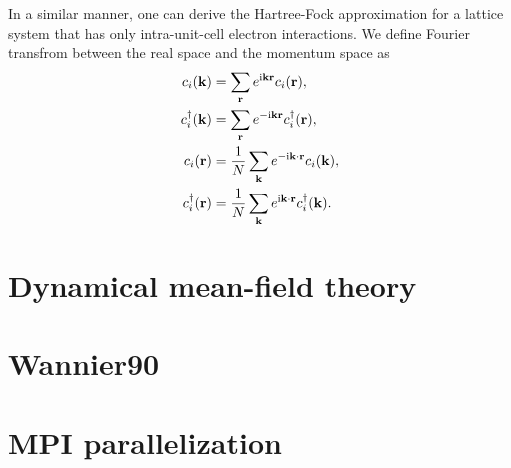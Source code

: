\documentclass[submission, LectureNotes]{SciPost}
\newcommand{\bk}{\ensuremath{{\bf k}}}
\newcommand{\br}{\ensuremath{{\bf r}}}
\newcommand\ii{\mathrm{i}}%
\begin{document}
In a similar manner, one can derive the Hartree-Fock approximation for a lattice system that
has only intra-unit-cell electron interactions.
We define Fourier transfrom between the real space and the momentum space as
\begin{align}
    c_i(\bk) &=  \sum_{\bf r} e^{\ii {\bf k} {\bf r}} c_i({\bf r}),\\
    c^\dagger_i(\bk) &=  \sum_{\bf r} e^{-\ii {\bf k} {\bf r}} c^\dagger_i({\bf r}),\\
    c_i(\br) &= \frac{1}{{N}} \sum_\bk e^{-\ii \bk\cdot\br} c_i(\bk),\\
    c^\dagger_i(\br) &= \frac{1}{{N}} \sum_\bk e^{\ii \bk\cdot\br} c^\dagger_i(\bk).
\end{align}


\clearpage
\section{Dynamical mean-field theory}

\clearpage
\section{Wannier90}

\clearpage
\section{MPI parallelization}

\begin{appendix}
\end{appendix}



\nolinenumbers
\end{document}
